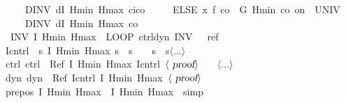 \documentclass[envcountsame]{llncs}
\begin{document}
\begin{example}
\begin{isabellebody}
\ \ \ \ \ DINV\ {\isacharparenleft}dI\ Hmin\ Hmax\ {\isacharparenleft}c\isactrlsub i{\isacharminus}c\isactrlsub o{\isacharparenright}{\isacharparenright}{\isacharparenright}\ \isanewline
\ \ \ \ ELSE\ {\isacharparenleft}x{\isasymacute}{\isacharequal}\ f\ {\isacharparenleft}{\isacharminus}c\isactrlsub o{\isacharparenright}\ {\isacharampersand}\ G\ Hmin\ {\isacharparenleft}{\isacharminus}c\isactrlsub o{\isacharparenright}\ on\ {\isacharbraceleft}{}{\isachardot}{\isachardot}{\isasymtau}{\isacharbraceright}\ UNIV\ {\isacharat}\ {}\isanewline 
\ \ \ \ \ DINV\ {\isacharparenleft}dI\ Hmin\ Hmax\ {\isacharparenleft}{\isacharminus}c\isactrlsub o{\isacharparenright}{\isacharparenright}{\isacharparenright}{\isacharparenright}\ {\isacharparenright}\isanewline
\ \ INV\ I\ Hmin\ Hmax{\isacharparenright}{\isachardoublequoteclose}\ {\isacharparenleft}\ {\isachardoublequoteopen}LOOP\ {\isacharparenleft}{\isacharquery}ctrl{\isacharsemicolon}{\isacharquery}dyn{\isacharparenright}\ INV\ {\isacharunderscore}\ {\isasymle}\ {\isacharquery}ref{\isachardoublequoteclose}{\isacharparenright}\isanewline
{}\isamarkupfalse%
{\isacharminus}\isanewline
\ \ \isanewline
\ \ \isamarkupfalse%
\ {\isacharquery}Icntrl\ {\isacharequal}\ {\isachardoublequoteopen}{\isasymlambda}s{\isachardot}\ I\ Hmin\ Hmax\ s\ {\isasymand}\ s{\isachardollar}{}\ {\isacharequal}\ {}\ {\isasymand}\ s{\isachardollar}{}\ {\isacharequal}\ s{\isachardollar}{}{\isachardoublequoteclose}$\langle \dots\rangle$\isanewline
\ \ \isamarkupfalse%
\ ctrl{\isacharcolon}\ {\isachardoublequoteopen}{\isacharquery}ctrl\ {\isasymle}\ Ref\ {\isasymlceil}I\ Hmin\ Hmax{\isasymrceil}\ {\isasymlceil}{\isacharquery}Icntrl{\isasymrceil}{\isachardoublequoteclose}\ $\langle \isa{proof}\rangle$\isanewline
\ \ \ $\langle \dots\rangle$\isanewline
\ \ \isamarkupfalse%
\ dyn{\isacharcolon}\ {\isachardoublequoteopen}{\isacharquery}dyn\ {\isasymle}\ Ref\ {\isasymlceil}{\isacharquery}Icntrl{\isasymrceil}\ {\isasymlceil}I\ Hmin\ Hmax{\isasymrceil}{\isachardoublequoteclose}\ $\langle \isa{proof}\rangle$\isanewline
\ \ \isanewline
\ \ \isamarkupfalse%
\ pre{\isacharunderscore}pos{\isacharcolon}\ {\isachardoublequoteopen}{\isasymlceil}I\ Hmin\ Hmax{\isasymrceil}\ {\isasymle}\ {\isasymlceil}I\ Hmin\ Hmax{\isasymrceil}{\isachardoublequoteclose}\ \isamarkupfalse\ simp\isanewline

\end{isabellebody}
\end{example}
\end{document}
